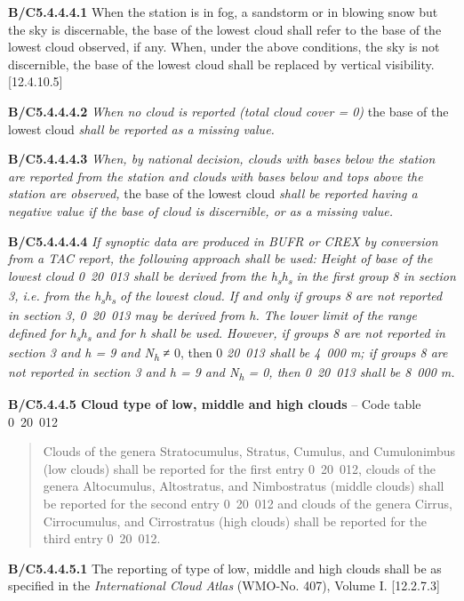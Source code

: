 \textbf{B/C5.4.4.4.1} When the station is in fog, a sandstorm or in blowing snow but the sky is discernable, the base of the lowest cloud shall refer to the base of the lowest cloud observed, if any. When, under the above conditions, the sky is not discernible, the base of the lowest cloud shall be replaced by vertical visibility. {[}12.4.10.5{]}

\textbf{B/C5.4.4.4.2} \emph{When no cloud is reported (total cloud cover = 0)} the base of the lowest cloud \emph{shall be reported as a missing value.}

\textbf{B/C5.4.4.4.3} \emph{When, by national decision, clouds with bases below the station are reported from the station and clouds with bases below and tops above the station are observed,} the base of the lowest cloud \emph{shall be reported having a negative value if the base of cloud is discernible, or as a missing value.}

\textbf{B/C5.4.4.4.4} \emph{If synoptic data are produced in BUFR or CREX by conversion from a TAC report, the following approach shall be used: Height of base of the lowest cloud 0}~\emph{20}~\emph{013 shall be derived from the h\textsubscript{s}h\textsubscript{s} in the first group 8 in section 3, i.e. from the h\textsubscript{s}h\textsubscript{s} of the lowest cloud. If and only if groups 8 are not reported in section 3, 0}~\emph{20}~\emph{013 may be derived from h. The lower limit of the range defined for h\textsubscript{s}h\textsubscript{s} and for h shall be used. However, if groups 8 are not reported in section 3 and h = 9 and N\textsubscript{h}} ≠ 0, then 0 \emph{20}~\emph{013 shall be 4}~\emph{000 m; if groups 8 are not reported in section 3 and h = 9 and N\textsubscript{h} = 0, then 0}~\emph{20}~\emph{013 shall be 8}~\emph{000 m.}

\textbf{B/C5.4.4.5 Cloud type of low, middle and high clouds} -- Code table 0~20~012

\begin{quote}
Clouds of the genera Stratocumulus, Stratus, Cumulus, and Cumulonimbus (low clouds) shall be reported for the first entry 0~20~012, clouds of the genera Altocumulus, Altostratus, and Nimbostratus (middle clouds) shall be reported for the second entry 0~20~012 and clouds of the genera Cirrus, Cirrocumulus, and Cirrostratus (high clouds) shall be reported for the third entry 0~20~012.
\end{quote}

\textbf{B/C5.4.4.5.1} The reporting of type of low, middle and high clouds shall be as specified in the \emph{International Cloud Atlas} (WMO-No. 407), Volume I. {[}12.2.7.3{]}

